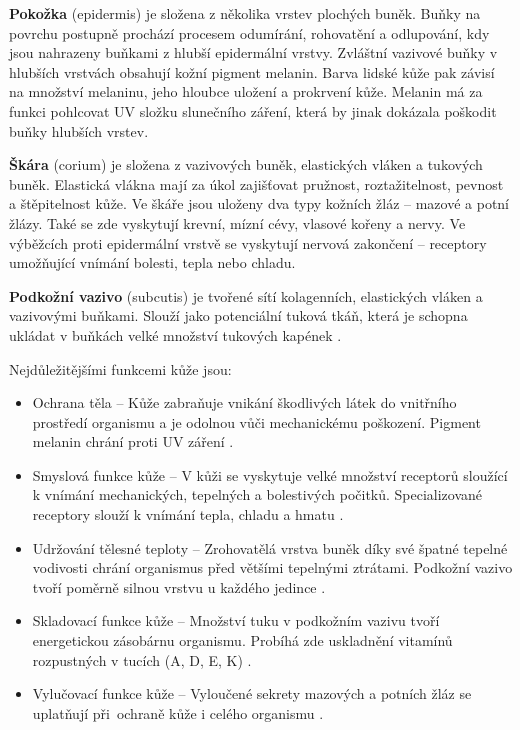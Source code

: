 \textbf{Pokožka} (epidermis) je složena z několika vrstev plochých buněk. Buňky na povrchu postupně prochází procesem odumírání, rohovatění a odlupování, kdy jsou nahrazeny buňkami z hlubší epidermální vrstvy. Zvláštní vazivové buňky v hlubších vrstvách obsahují kožní pigment melanin. Barva lidské kůže pak závisí na množství melaninu, jeho hloubce uložení a prokrvení kůže. Melanin má za funkci pohlcovat UV složku slunečního záření, která by jinak dokázala poškodit buňky hlubších vrstev.

\textbf{Škára} (corium) je složena z vazivových buněk, elastických vláken a tukových buněk. Elastická vlákna mají za úkol zajišťovat pružnost, roztažitelnost, pevnost a štěpitelnost kůže. Ve škáře jsou uloženy dva typy kožních žláz -- mazové a potní žlázy. Také se zde vyskytují krevní, mízní cévy, vlasové kořeny a nervy. Ve výběžcích proti epidermální vrstvě se vyskytují nervová zakončení -- receptory umožňující vnímání bolesti, tepla nebo chladu.

\textbf{Podkožní vazivo} (subcutis) je tvořené sítí kolagenních, elastických vláken a vazivovými buňkami. Slouží jako potenciální tuková tkáň, která je schopna ukládat v buňkách velké množství tukových kapének \cite{ZakladyFunkcniAnatomieCloveka}.

Nejdůležitějšími funkcemi kůže jsou:
\begin{itemize}
    \item Ochrana těla -- Kůže zabraňuje vnikání škodlivých látek do vnitřního prostředí organismu a je odolnou vůči mechanickému poškození. Pigment melanin chrání proti UV záření \cite{ZakladyFunkcniAnatomieCloveka}.
    \item Smyslová funkce kůže -- V kůži se vyskytuje velké množství receptorů sloužící k vnímání mechanických, tepelných a bolestivých počitků. Specializované receptory slouží k vnímání tepla, chladu a hmatu \cite{ZakladyFunkcniAnatomieCloveka}.
    \item Udržování tělesné teploty -- Zrohovatělá vrstva buněk díky své špatné tepelné vodivosti chrání organismus před většími tepelnými ztrátami. Podkožní vazivo tvoří poměrně silnou vrstvu u každého jedince \cite{ZakladyFunkcniAnatomieCloveka}.
     \item Skladovací funkce kůže -- Množství tuku v podkožním vazivu tvoří energetickou zásobárnu organismu. Probíhá zde uskladnění vitamínů rozpustných v tucích (A, D, E, K) \cite{ZakladyFunkcniAnatomieCloveka}.
    \item Vylučovací funkce kůže -- Vyloučené sekrety mazových a potních žláz se uplatňují při~ochraně kůže i celého organismu \cite{ZakladyFunkcniAnatomieCloveka}.
\end{itemize}

